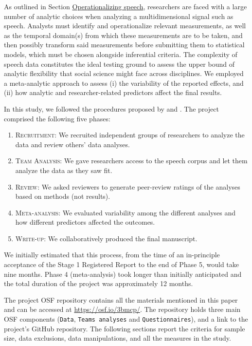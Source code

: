 \documentclass[Review,times,sageh]{sagej}
\providecommand{\tightlist}{\setlength{\itemsep}{0pt}\setlength{\parskip}{0pt}}
\begin{document}
As outlined in Section \protect\hyperlink{s:operspeech}{Operationalizing speech}, researchers are faced with a large number of analytic choices when analyzing a multidimensional signal such as speech.
Analysts must identify and operationalize relevant measurements, as well as the temporal domain(s) from which these measurements are to be taken, and then possibly transform said measurements before submitting them to statistical models, which must be chosen alongside inferential criteria.
The complexity of speech data constitutes the ideal testing ground to assess the upper bound of analytic flexibility that social science might face across disciplines.
We employed a meta-analytic approach to assess (i) the variability of the reported effects, and (ii) how analytic and researcher-related predictors affect the final results.

In this study, we followed the procedures proposed by \citet{Parker2020} and \citet{aczel2021}.
The project comprised the following five phases:

\begin{enumerate}
\def\labelenumi{\arabic{enumi}.}
\tightlist
\item
  \textsc{Recruitment}: We recruited independent groups of researchers to analyze the data and review others' data analyses.
\item
  \textsc{Team Analysis}: We gave researchers access to the speech corpus and let them analyze the data as they saw fit.
\item
  \textsc{Review}: We asked reviewers to generate peer-review ratings of the analyses based on methods (not results).
\item
  \textsc{Meta-analysis}: We evaluated variability among the different analyses and how different predictors affected the outcomes.
\item
  \textsc{Write-up}: We collaboratively produced the final manuscript.
\end{enumerate}

We initially estimated that this process, from the time of an in-principle acceptance of the Stage 1 Registered Report to the end of Phase 5, would take nine months.
Phase 4 (meta-analysis) took longer than initially anticipated and the total duration of the project was approximately 12 months.

The project OSF repository contains all the materials mentioned in this paper and can be accessed at \url{https://osf.io/3bmcp/}.
The repository holds three main OSF components (\texttt{Data}, \texttt{Teams\ analyses} and \texttt{Questionnaires}), and a link to the project's GitHub repository.
The following sections report the criteria for sample size, data exclusions, data manipulations, and all the measures in the study.
\end{document}
